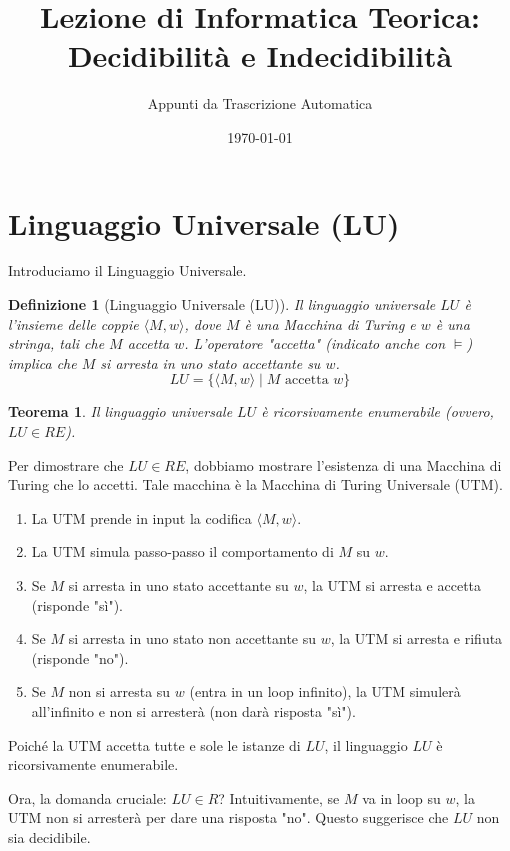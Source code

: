 \documentclass[a4paper]{article}
\title{Lezione di Informatica Teorica: Decidibilità e Indecidibilità}
\author{Appunti da Trascrizione Automatica}
\date{\today}
\makeatletter
\newtheorem{theorem}{Teorema}[section] %
\newtheorem{definition}{Definizione}[section] %
\renewenvironment{proof}[1][\proofname]{\par
  \pushQED{\qed}%
  \normalfont \topsep6\p@\@plus6\p@\relax
  \trivlist
  \item[\hskip\labelsep
        \bfseries
    #1\@addpunct{.}]\ignorespaces
}{%
  \popQED\endtrivlist\@endpefalse
}
\makeatother
\begin{document}
\maketitle
\tableofcontents
\newpage

\section{Linguaggio Universale (LU)}

Introduciamo il Linguaggio Universale.
\begin{definition}[Linguaggio Universale (LU)]
Il linguaggio universale $LU$ è l'insieme delle coppie $\langle M, w \rangle$, dove $M$ è una Macchina di Turing e $w$ è una stringa, tali che $M$ accetta $w$. L'operatore "accetta" (indicato anche con $\models$) implica che $M$ si arresta in uno stato accettante su $w$.
\[ LU = \{ \langle M, w \rangle \mid M \text{ accetta } w \} \]
\end{definition}

\begin{theorem}
Il linguaggio universale $LU$ è ricorsivamente enumerabile (ovvero, $LU \in RE$).
\end{theorem}
\begin{proof}
Per dimostrare che $LU \in RE$, dobbiamo mostrare l'esistenza di una Macchina di Turing che lo accetti. Tale macchina è la Macchina di Turing Universale (UTM).
\begin{enumerate}
    \item La UTM prende in input la codifica $\langle M, w \rangle$.
    \item La UTM simula passo-passo il comportamento di $M$ su $w$.
    \item Se $M$ si arresta in uno stato accettante su $w$, la UTM si arresta e accetta (risponde "sì").
    \item Se $M$ si arresta in uno stato non accettante su $w$, la UTM si arresta e rifiuta (risponde "no").
    \item Se $M$ non si arresta su $w$ (entra in un loop infinito), la UTM simulerà all'infinito e non si arresterà (non darà risposta "sì").
\end{enumerate}
Poiché la UTM accetta tutte e sole le istanze di $LU$, il linguaggio $LU$ è ricorsivamente enumerabile.
\end{proof}

Ora, la domanda cruciale: $LU \in R$? Intuitivamente, se $M$ va in loop su $w$, la UTM non si arresterà per dare una risposta "no". Questo suggerisce che $LU$ non sia decidibile.
\end{document}
